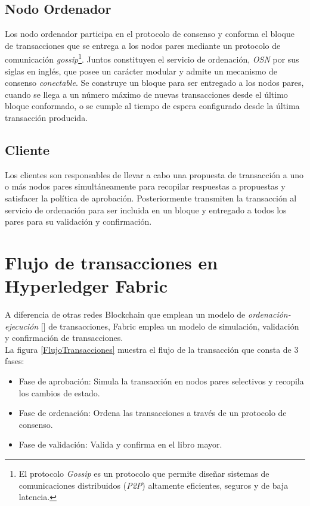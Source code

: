\subsection{Nodo Ordenador}
Los nodo ordenador participa en el protocolo de consenso y conforma el bloque de transacciones que se entrega a los nodos pares mediante un protocolo de comunicaci\'on \emph{gossip}\footnote{El protocolo \emph{Gossip} es un protocolo que permite dise\~nar sistemas de comunicaciones distribuidos (\emph{P2P}) altamente eficientes, seguros y de baja latencia.}. Juntos constituyen el servicio de ordenaci\'on, \emph{OSN} por sus siglas en ingl\'es, que posee un car\'acter modular y admite un mecanismo de consenso \emph{conectable}. Se construye un bloque para ser entregado a los nodos pares, cuando se llega a un n\'umero m\'aximo de nuevas transacciones desde el \'ultimo bloque conformado, o se cumple al tiempo de espera configurado desde la \'ultima transacci\'on producida.

\subsection{Cliente}
Los clientes son responsables de llevar a cabo una propuesta de transacci\'on a uno o m\'as nodos pares simult\'aneamente para recopilar respuestas a propuestas y satisfacer la pol\'itica de aprobaci\'on. Posteriormente transmiten la transacci\'on al servicio de ordenaci\'on para ser incluida en un bloque y entregado a todos los pares para su validaci\'on y confirmaci\'on.

\section{Flujo de transacciones en Hyperledger Fabric}
A diferencia de otras redes Blockchain que emplean un modelo de \emph{ordenaci\'on-ejecución} [\cite{vukolic2017rethinking}] de transacciones, Fabric emplea un modelo de simulaci\'on, validaci\'on y confirmaci\'on de transacciones.\\ 

La figura \ref{FlujoTransacciones} muestra el flujo de la transacci\'on que consta de 3 fases:
\begin{itemize}
\item[1] Fase de aprobaci\'on: Simula la transacci\'on en nodos pares selectivos y recopila los cambios de estado.
\item[2] Fase de ordenaci\'on: Ordena las transacciones a trav\'es de un protocolo de consenso.
\item[3] Fase de validaci\'on: Valida y confirma en el libro mayor.
\end{itemize}




